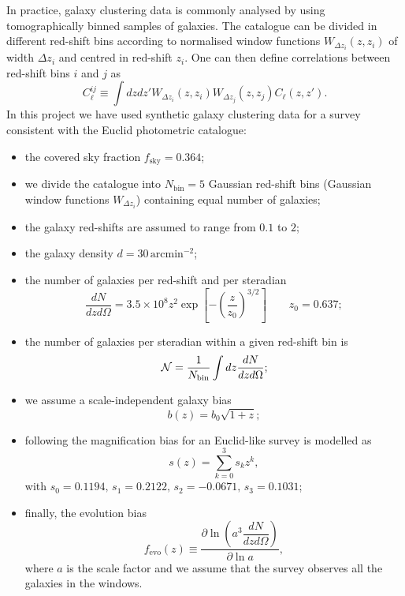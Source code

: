 In practice, galaxy clustering data is commonly analysed by using tomographically binned samples of galaxies. The catalogue can be divided in different red-shift bins according to normalised window functions $W_{\Delta z_i}(z,z_i)$ of width $\Delta z_i$ and centred in red-shift $z_i$. One can then define correlations between red-shift bins $i$ and $j$ as
\begin{equation}
\label{Eq:binned-angular-matter-power-spectrum}
C_\ell^{ij} \equiv \int dz dz' W_{\Delta z_i}(z,z_i) W_{\Delta z_j}(z,z_j) C_\ell (z,z').
\end{equation} 
In this project we have used synthetic galaxy clustering data for a survey consistent with the Euclid photometric catalogue:
\begin{itemize}
\item the covered sky fraction $f_{\mathrm{sky}}=0.364$; 
\item we divide the catalogue into $N_{\mathrm{bin}}=5$ Gaussian red-shift bins (Gaussian window functions $W_{\Delta z_i}$) containing equal number of galaxies;
\item the galaxy red-shifts are assumed to range from $0.1$ to $2$;
\item the galaxy density $d=30\,\mathrm{arcmin^{-2}}$;
\item the number of galaxies per red-shift and per steradian 
\begin{equation}
\label{Eq:dNdzdOmega}
\dfrac{dN}{dzd\Omega} = 3.5\times 10^8 z^2 \exp \left[-\left( \frac{z}{z_0} \right)^{3/2} \right] \qquad z_0=0.637; 
\end{equation}
\item the number of galaxies per steradian within a given red-shift bin is 
\begin{equation}
\label{Eq:number-galaxies-per-bin}
\,{\mathcal N} = \frac{1}{N_{\mathrm{bin}}}\int dz \dfrac{dN}{dzd\Omega};
\end{equation}
\item we assume a scale-independent galaxy bias 
\begin{equation}
b(z) = b_0\sqrt{1+z};
\label{Eq:galaxy-bias}
\end{equation}
\item following  the magnification bias for an Euclid-like survey is modelled as 
\begin{equation}
s(z) = \sum_{k=0}^3 s_k z^k,
\label{Eq:magnification-bias}
\end{equation}
with $s_0 = 0.1194,\, s_1 = 0.2122,\, s_2 = -0.0671,\, s_3 = 0.1031$;
\item finally, the evolution bias 
\begin{equation}
f_{\mathrm{evo}}(z) \equiv \dfrac{\partial \ln \left( a^3 \dfrac{dN}{dzd\Omega}  \right)}{\partial \ln a},
\label{Eq:evolution-bias}
\end{equation}    
where $a$ is the scale factor and we assume that the survey observes all the galaxies in the windows.
\end{itemize}   

